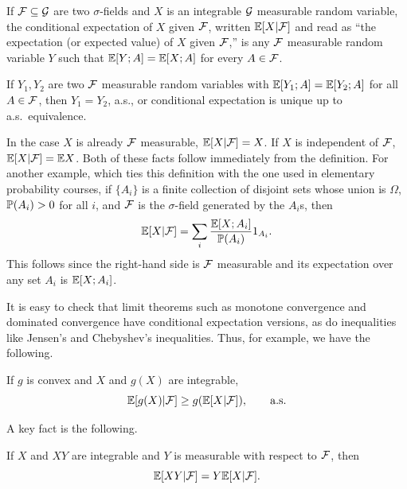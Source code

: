 \begin{definition}\label{def:ch1_1.10}
If $\FC \subseteq \GC$ are two $\sigma$-fields and $X$ is an integrable $\GC$ measurable random variable, the conditional expectation of $X$ given $\FC$, written $\E[X\mid \FC]$ and read as ``the expectation (or expected value) of $X$ given $\FC$,'' is any $\FC$ measurable random variable $Y$ such that $\E[Y;A] = \E[X;A]$ for every $A \in \FC$.
\end{definition}

If $Y_1,Y_2$ are two $\FC$ measurable random variables with $\E[Y_1;A] = \E[Y_2;A]$ for all $A \in \FC$, then $Y_1 = Y_2$, a.s., or conditional expectation is unique up to a.s.\ equivalence.

In the case $X$ is already $\FC$ measurable, $\E[X\mid \FC] = X$. If $X$ is independent of $\FC$, $\E[X\mid \FC] = \E X$. Both of these facts follow immediately from the definition. For another example, which ties this definition with the one used in elementary probability courses, if $\{A_i\}$ is a finite collection of disjoint sets whose union is $\Omega$, $\P(A_i) > 0$ for all $i$, and $\FC$ is the $\sigma$-field generated by the $A_i$s, then
\begin{equation}\label{eq:ch1_1.8}
    \E[X\mid \FC] = \sum_i \frac{\E[X;A_i]}{\P(A_i)}1_{A_i}.
\end{equation}
This follows since the right-hand side is $\FC$ measurable and its expectation over any set $A_i$ is $\E[X;A_i]$.

It is easy to check that limit theorems such as monotone convergence and dominated convergence have conditional expectation versions, as do inequalities like Jensen's and Chebyshev's inequalities. Thus, for example, we have the following.

\begin{proposition}\label{prop:ch1_1.11}
If $g$ is convex and $X$ and $g(X)$ are integrable,
\begin{equation}\label{eq:ch1_1.9}
    \E[g(X)\mid \FC] \geq g(\E[X\mid \FC]), \qquad \textnormal{a.s.}
\end{equation}
\end{proposition}

\mpagebreak

A key fact is the following.

\begin{proposition}\label{prop:ch1_1.12}
If $X$ and $XY$ are integrable and $Y$ is measurable with respect to $\FC$, then
\begin{equation}\label{eq:ch1_1.10}
    \E[XY\mid \FC] = Y\E[X\mid \FC].
\end{equation}
\end{proposition}

